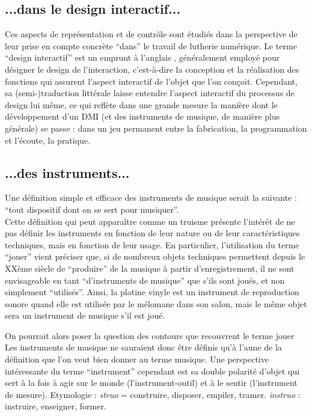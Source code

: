 \subsection*{...dans le design interactif...}

Ces aspects de représentation et de contrôle sont étudiés dans la perspective de leur prise en compte concrète ``dans'' le travail de lutherie numérique. Le terme ``design interactif'' est un emprunt à l'anglais , généralement employé pour désigner le design de l'interaction, c'est-à-dire la conception et la réalisation des fonctions qui assurent l'aspect interactif de l'objet que l'on conçoit. Cependant, sa (semi-)traduction littérale laisse entendre l'aspect interactif du processus de design lui même, ce qui reflète dans une grande mesure la manière dont le développement d'un \gls{DMI} (et des instruments de musique, de manière plus générale) se passe : dans un jeu permanent entre la fabrication, la programmation et l'écoute, la pratique.

\subsection*{...des instruments...}

Une définition simple et efficace des instruments de musique serait la suivante : ``tout dispositif dont on se sert pour musiquer''.\\
Cette définition qui peut apparaître comme un truisme présente l'intérêt de ne pas définir les instruments en fonction de leur nature ou de leur caractéristiques techniques, mais en fonction de leur usage. En particulier, l'utilisation du terme ``jouer'' vient préciser que, si de nombreux objets techniques permettent depuis le XXème siècle de ``produire'' de la musique à partir d'enregistrement, il ne sont envisageable en tant ``d'instruments de musique'' que s'ils sont joués, et non simplement ``utilisés''. Ainsi, la platine vinyle est un instrument de reproduction sonore quand elle est utilisée par le mélomane dans son salon, mais le même objet sera un instrument de musique s'il est joué.

On pourrait alors poser la question des contours que recouvrent le terme jouer
Les instruments de musique ne sauraient donc être définis qu'à l'aune de la définition que l'on veut bien donner au terme musique. Une perspective intéressante du terme ``instrument'' cependant est sa double polarité d'objet qui sert à la fois à agir sur le monde (l'instrument-outil) et à le sentir (l'instrument de mesure).
Etymologie : \textit{struo} = construire, disposer, empiler, tramer.  \textit{instruo} : instruire, enseigner, former.

